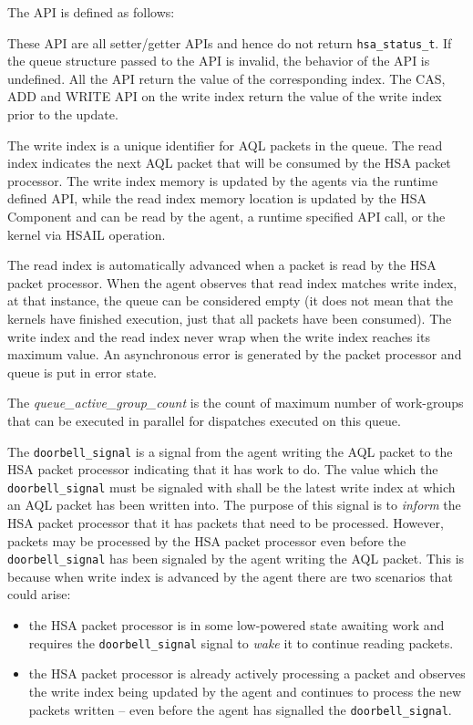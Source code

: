 \documentclass{book}
\begin{document}
The API is defined as follows:



These API are all setter/getter APIs and hence do not return
\texttt{hsa\_status\_t}. If the queue structure passed to the API is
invalid, the behavior of the API is undefined. All the API return
the value of the corresponding index. The CAS, ADD and WRITE API on
the write index return the value of the write index prior to the
update.

The write index is a unique identifier for AQL packets in the
queue. The read index indicates the next AQL packet that will be
consumed by the HSA packet processor.  The write index
memory is updated by the agents via the runtime defined
API, while the read index memory location is updated by
the H\-S\-A Component and can be read by the agent,
a runtime specified API call, or the kernel via HSAIL operation.

The read index is automatically advanced when a packet is
read by the HSA packet processor. When the agent observes that read
index matches write index, at that instance, the queue can be
considered empty (it does not mean that the kernels have finished
execution, just that all packets have been consumed). The write
index and the read index never wrap when the write index reaches
its maximum value. An asynchronous error is generated by the packet
processor and queue is put in error state.

The {\itshape
queue\_active\_group\_count} is the count of maximum number of
work-groups that can be executed in parallel for dispatches executed
on this queue.

The \texttt{doorbell\_signal} is a signal from the agent writing the
AQL packet to the HSA packet processor indicating that it has work
to do. The value which the \texttt{doorbell\_signal} must be
signaled with shall be the latest write index at
which an AQL packet has been written into.  The purpose of this
signal is to \emph{inform} the HSA packet processor that it has
packets that need to be processed. However, packets may be processed
by the HSA packet processor even before the
\texttt{doorbell\_signal} has been signaled by the agent writing the
AQL packet.  This is because when write index is advanced by the
agent there are two scenarios that could arise:

\begin{itemize}
        \item the HSA packet processor is in some low-powered state
                awaiting work and requires the
                \texttt{doorbell\_signal} signal to \emph{wake} it
                to continue reading packets.
        \item the H\-S\-A
                packet processor is already actively processing a
                packet and observes the write index being
                updated by the agent and continues to process the
                new packets written -- even before the agent has
                signalled the \texttt{doorbell\_signal}.
\end{itemize}
\end{document}
